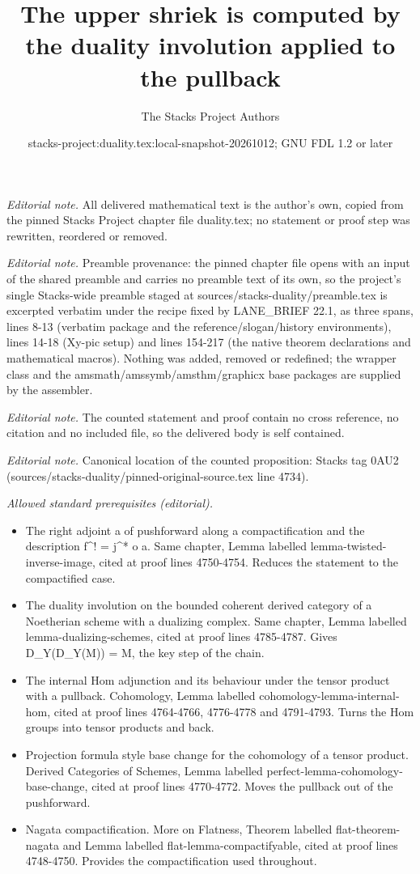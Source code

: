 \documentclass[10pt,a4paper]{amsart}
\title{The upper shriek is computed by the duality involution applied to the pullback}
\author{The Stacks Project Authors}
\date{stacks-project:duality.tex:local-snapshot-20261012; GNU FDL 1.2 or later}
\theoremstyle{plain}
\theoremstyle{definition}
\theoremstyle{remark}
\numberwithin{equation}{subsection}
\begin{document}
\maketitle
\noindent\textit{Editorial note.} All delivered mathematical text is the author's own, copied from the pinned Stacks Project chapter file duality.tex; no statement or proof step was rewritten, reordered or removed.\par\medskip
\noindent\textit{Editorial note.} Preamble provenance: the pinned chapter file opens with an input of the shared preamble and carries no preamble text of its own, so the project's single Stacks-wide preamble staged at sources/stacks-duality/preamble.tex is excerpted verbatim under the recipe fixed by LANE\_BRIEF 22.1, as three spans, lines 8-13 (verbatim package and the reference/slogan/history environments), lines 14-18 (Xy-pic setup) and lines 154-217 (the native theorem declarations and mathematical macros). Nothing was added, removed or redefined; the wrapper class and the amsmath/amssymb/amsthm/graphicx base packages are supplied by the assembler.\par\medskip
\noindent\textit{Editorial note.} The counted statement and proof contain no cross reference, no citation and no included file, so the delivered body is self contained.\par\medskip
\noindent\textit{Editorial note.} Canonical location of the counted proposition: Stacks tag 0AU2 (sources/stacks-duality/pinned-original-source.tex line 4734).\par\medskip
\noindent\textit{Allowed standard prerequisites (editorial).}\begin{itemize}
\item The right adjoint a of pushforward along a compactification and the description f\textasciicircum{}! = j\textasciicircum{}* o a. Same chapter, Lemma labelled lemma-twisted-inverse-image, cited at proof lines 4750-4754. Reduces the statement to the compactified case.
\item The duality involution on the bounded coherent derived category of a Noetherian scheme with a dualizing complex. Same chapter, Lemma labelled lemma-dualizing-schemes, cited at proof lines 4785-4787. Gives D\_Y(D\_Y(M)) = M, the key step of the chain.
\item The internal Hom adjunction and its behaviour under the tensor product with a pullback. Cohomology, Lemma labelled cohomology-lemma-internal-hom, cited at proof lines 4764-4766, 4776-4778 and 4791-4793. Turns the Hom groups into tensor products and back.
\item Projection formula style base change for the cohomology of a tensor product. Derived Categories of Schemes, Lemma labelled perfect-lemma-cohomology-base-change, cited at proof lines 4770-4772. Moves the pullback out of the pushforward.
\item Nagata compactification. More on Flatness, Theorem labelled flat-theorem-nagata and Lemma labelled flat-lemma-compactifyable, cited at proof lines 4748-4750. Provides the compactification used throughout.
\end{itemize}\medskip
\end{document}
